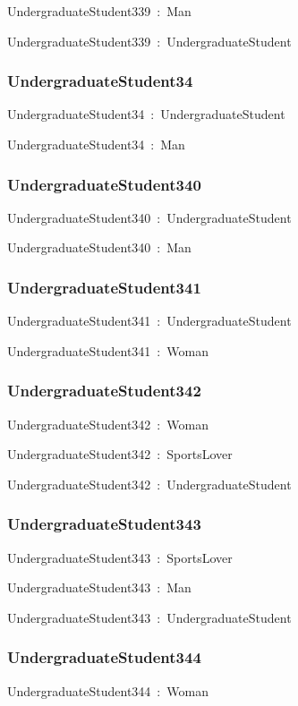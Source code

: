 \documentclass{article}
\begin{document}
UndergraduateStudent339~:~Man

UndergraduateStudent339~:~UndergraduateStudent

\subsubsection*{UndergraduateStudent34}

UndergraduateStudent34~:~UndergraduateStudent

UndergraduateStudent34~:~Man

\subsubsection*{UndergraduateStudent340}

UndergraduateStudent340~:~UndergraduateStudent

UndergraduateStudent340~:~Man

\subsubsection*{UndergraduateStudent341}

UndergraduateStudent341~:~UndergraduateStudent

UndergraduateStudent341~:~Woman

\subsubsection*{UndergraduateStudent342}

UndergraduateStudent342~:~Woman

UndergraduateStudent342~:~SportsLover

UndergraduateStudent342~:~UndergraduateStudent

\subsubsection*{UndergraduateStudent343}

UndergraduateStudent343~:~SportsLover

UndergraduateStudent343~:~Man

UndergraduateStudent343~:~UndergraduateStudent

\subsubsection*{UndergraduateStudent344}

UndergraduateStudent344~:~Woman
\end{document}
